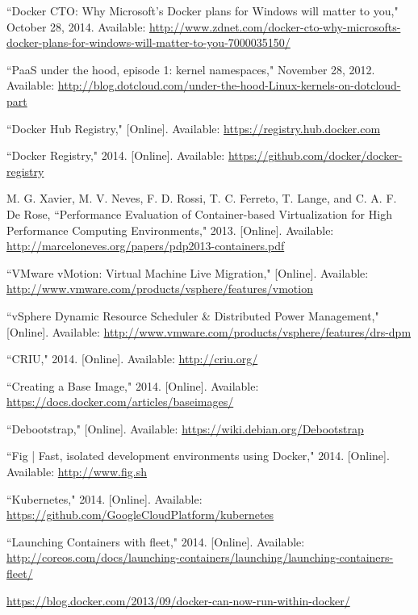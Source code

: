 
\begin{thebibliography}{99}
\begin{singlespace}
\raggedright

``Docker CTO: Why Microsoft's Docker plans for Windows will matter to you," October 28, 2014. Available: \url{http://www.zdnet.com/docker-cto-why-microsofts-docker-plans-for-windows-will-matter-to-you-7000035150/}

``PaaS under the hood, episode 1: kernel namespaces," November 28, 2012. Available: \url{http://blog.dotcloud.com/under-the-hood-Linux-kernels-on-dotcloud-part}

``Docker Hub Registry," [Online]. Available: \url{https://registry.hub.docker.com}

``Docker Registry," 2014. [Online]. Available: \url{https://github.com/docker/docker-registry}

M. G. Xavier, M. V. Neves, F. D. Rossi, T. C. Ferreto, T. Lange, and C. A. F. De Rose, ``Performance Evaluation of Container-based Virtualization for High Performance Computing Environments," 2013. [Online]. Available: \url{http://marceloneves.org/papers/pdp2013-containers.pdf}

``VMware vMotion: Virtual Machine Live Migration," [Online]. Available: \url{http://www.vmware.com/products/vsphere/features/vmotion}

``vSphere Dynamic Resource Scheduler \& Distributed Power Management," [Online]. Available: \url{http://www.vmware.com/products/vsphere/features/drs-dpm}

``CRIU," 2014. [Online]. Available: \url{http://criu.org/}

``Creating a Base Image," 2014. [Online]. Available: \url{https://docs.docker.com/articles/baseimages/}

``Debootstrap," [Online]. Available: \url{https://wiki.debian.org/Debootstrap}

``Fig | Fast, isolated development environments using Docker," 2014. [Online]. Available: \url{http://www.fig.sh}

``Kubernetes," 2014. [Online]. Available: \url{https://github.com/GoogleCloudPlatform/kubernetes}

``Launching Containers with fleet," 2014. [Online]. Available: \url{http://coreos.com/docs/launching-containers/launching/launching-containers-fleet/}

\url{https://blog.docker.com/2013/09/docker-can-now-run-within-docker/}

\end{singlespace}
\end{thebibliography}
